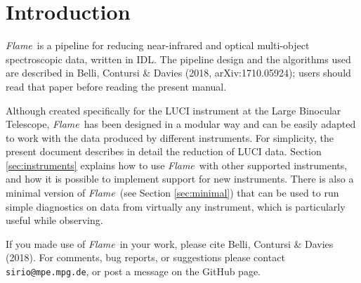 \documentclass[a4paper]{article}
\newcommand{\flame}{\emph{Flame}}
\begin{document}
\begin{sloppypar}


\newpage
\section{Introduction}
\label{sec:introduction}

\flame\ is a pipeline for reducing near-infrared and optical multi-object spectroscopic data, written in IDL. The pipeline design and the algorithms used are described in Belli, Contursi \& Davies (2018, arXiv:1710.05924); users should read that paper before reading the present manual.

Although created specifically for the LUCI instrument at the Large Binocular Telescope, \flame\ has been designed in a modular way and can be easily adapted to work with the data produced by different instruments. For simplicity, the present document describes in detail the reduction of LUCI data. Section \ref{sec:instruments} explains how to use \flame\ with other supported instruments, and how it is possible to implement support for new instruments. There is also a minimal version of \flame\ (see Section \ref{sec:minimal}) that can be used to run simple diagnostics on data from virtually any instrument, which is particularly useful while observing.

If you made use of \flame\ in your work, please cite Belli, Contursi \& Davies (2018). For comments, bug reports, or suggestions please contact \texttt{sirio@mpe.mpg.de}, or post a message on the GitHub page.





\end{sloppypar}
\end{document}
